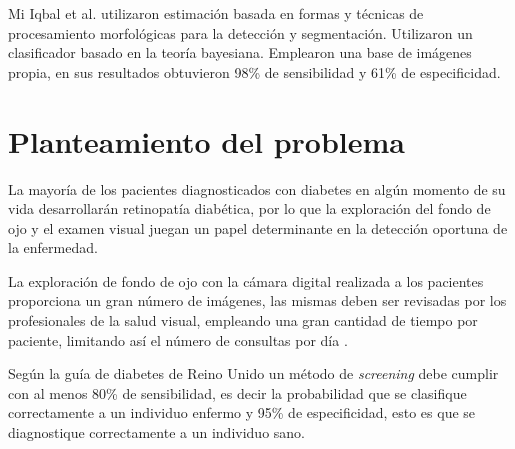 
Mi Iqbal et al. \cite{iqbal2006automatic} utilizaron estimación basada en formas y técnicas de procesamiento morfológicas para la detección y segmentación. Utilizaron un clasificador basado en la teoría bayesiana. Emplearon una base de imágenes propia, en sus resultados obtuvieron 98\% de sensibilidad y 61\% de especificidad.


\section{Planteamiento del problema}
La mayoría de los pacientes diagnosticados con diabetes en algún momento de su vida desarrollarán retinopatía diabética, por lo que la exploración del fondo de ojo y el examen visual juegan un papel determinante en la detección oportuna de la enfermedad. 


 La exploración de fondo de ojo con la cámara digital realizada a los pacientes proporciona un gran número de imágenes, las mismas  deben ser revisadas por los profesionales de la salud visual, empleando una gran cantidad de tiempo por paciente, limitando así el número de consultas por día \cite{selvathi2012automated}.
 
 
 Según la guía de diabetes de Reino Unido \cite{guide} un método de \textit{screening} debe cumplir con al menos  80\% de sensibilidad, es decir la probabilidad que se clasifique correctamente a un individuo enfermo y 95\% de especificidad, esto es que se diagnostique correctamente a un individuo sano.
 
